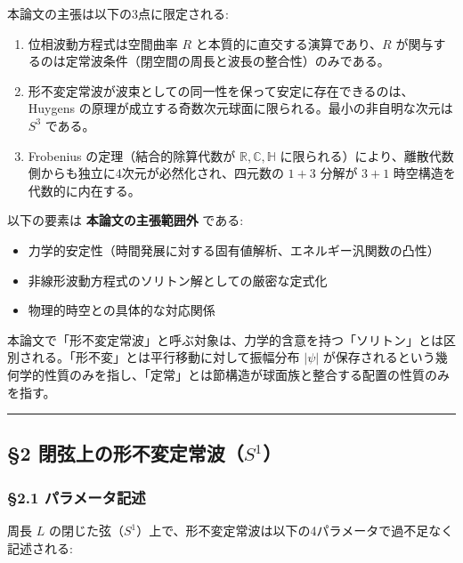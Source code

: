\documentclass[
  a4paper,11pt]{ltjsarticle}
\providecommand{\tightlist}{%
  \setlength{\itemsep}{0pt}\setlength{\parskip}{0pt}}
\theoremstyle{definition}
\theoremstyle{remark}
\begin{document}
本論文の主張は以下の3点に限定される:

\begin{enumerate}
\def\labelenumi{\arabic{enumi}.}
\tightlist
\item
  位相波動方程式は空間曲率 \(R\) と本質的に直交する演算であり、\(R\)
  が関与するのは定常波条件（閉空間の周長と波長の整合性）のみである。
\item
  形不変定常波が波束としての同一性を保って安定に存在できるのは、Huygens
  の原理が成立する奇数次元球面に限られる。最小の非自明な次元は \(S^3\)
  である。
\item
  Frobenius の定理（結合的除算代数が
  \(\mathbb{R}, \mathbb{C}, \mathbb{H}\)
  に限られる）により、離散代数側からも独立に4次元が必然化され、四元数の
  \(1+3\) 分解が \(3+1\) 時空構造を代数的に内在する。
\end{enumerate}

以下の要素は \textbf{本論文の主張範囲外} である:

\begin{itemize}
\tightlist
\item
  力学的安定性（時間発展に対する固有値解析、エネルギー汎関数の凸性）
\item
  非線形波動方程式のソリトン解としての厳密な定式化
\item
  物理的時空との具体的な対応関係
\end{itemize}

本論文で「形不変定常波」と呼ぶ対象は、力学的含意を持つ「ソリトン」とは区別される。「形不変」とは平行移動に対して振幅分布
\(|\psi|\)
が保存されるという幾何学的性質のみを指し、「定常」とは節構造が球面族と整合する配置の性質のみを指す。

\begin{center}\rule{0.5\linewidth}{0.5pt}\end{center}

\subsection{\texorpdfstring{§2
閉弦上の形不変定常波（\(S^1\)）}{§2 閉弦上の形不変定常波（S\^{}1）}}\label{ux9589ux5f26ux4e0aux306eux5f62ux4e0dux5909ux5b9aux5e38ux6ce2s1}

\subsubsection{§2.1
パラメータ記述}\label{ux30d1ux30e9ux30e1ux30fcux30bfux8a18ux8ff0}

周長 \(L\)
の閉じた弦（\(S^1\)）上で、形不変定常波は以下の4パラメータで過不足なく記述される:
\end{document}
